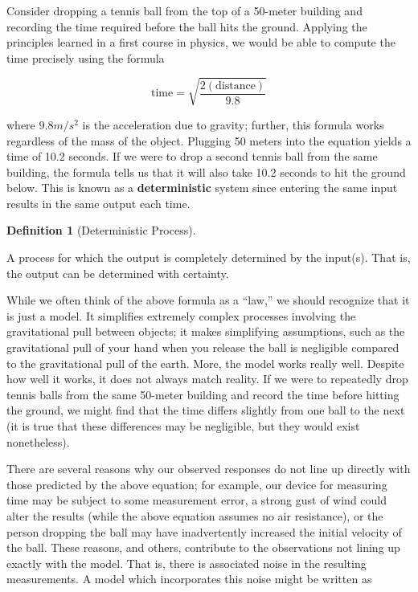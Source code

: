 \documentclass[
  letterpaper,
  DIV=11,
  numbers=noendperiod]{scrreprt}
\theoremstyle{plain}
\theoremstyle{definition}
\theoremstyle{definition}
\newtheorem{definition}{Definition}[chapter]
\theoremstyle{remark}
\begin{document}
Consider dropping a tennis ball from the top of a 50-meter building and
recording the time required before the ball hits the ground. Applying
the principles learned in a first course in physics, we would be able to
compute the time precisely using the formula

\[\text{time} = \sqrt{\frac{2(\text{distance})}{9.8}}\]

where \(9.8 m/s^2\) is the acceleration due to gravity; further, this
formula works regardless of the mass of the object. Plugging 50 meters
into the equation yields a time of 10.2 seconds. If we were to drop a
second tennis ball from the same building, the formula tells us that it
will also take 10.2 seconds to hit the ground below. This is known as a
\textbf{deterministic} system since entering the same input results in
the same output each time.

\begin{definition}[Deterministic
Process]\protect\hypertarget{def-deterministic-process}{}\label{def-deterministic-process}

A process for which the output is completely determined by the input(s).
That is, the output can be determined with certainty.

\end{definition}

While we often think of the above formula as a ``law,'' we should
recognize that it is just a model. It simplifies extremely complex
processes involving the gravitational pull between objects; it makes
simplifying assumptions, such as the gravitational pull of your hand
when you release the ball is negligible compared to the gravitational
pull of the earth. More, the model works really well. Despite how well
it works, it does not always match reality. If we were to repeatedly
drop tennis balls from the same 50-meter building and record the time
before hitting the ground, we might find that the time differs slightly
from one ball to the next (it is true that these differences may be
negligible, but they would exist nonetheless).

There are several reasons why our observed responses do not line up
directly with those predicted by the above equation; for example, our
device for measuring time may be subject to some measurement error, a
strong gust of wind could alter the results (while the above equation
assumes no air resistance), or the person dropping the ball may have
inadvertently increased the initial velocity of the ball. These reasons,
and others, contribute to the observations not lining up exactly with
the model. That is, there is associated noise in the resulting
measurements. A model which incorporates this noise might be written as
\end{document}
